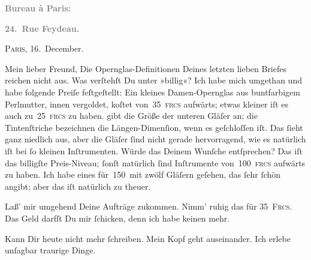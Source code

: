 \pstart
           \begin{otherlanguage}{french}\textcolor{gray}{\textbf{\textbf{Bureau à Paris:}}}\end{otherlanguage}\pend
           
\pstart
           \begin{otherlanguage}{french}\textcolor{gray}{\textbf{\textbf{24. Rue Feydeau.}}}\end{otherlanguage}\hfill \textsc{Paris}, 16. December.\pend
           
\pstart\center{}Mein lieber Freund,\pend\vspace{0.5em}
\pstart
           Die Opernglas-Definitionen Deines letzten lieben Briefes reichen nicht aus. Was
               verſtehſt Du unter »billig«? Ich habe mich umgethan\strikeout{,}
               und habe folgende Preiſe feſtgeſtellt: Ein kleines Damen-Opernglas aus buntfarbigem
               Perlmutter, innen vergoldet, koſtet von 35 \textsc{frcs} aufwärts;
               etwas kleiner iſt es auch zu 25 \textsc{frcs} zu haben. \label{K_L02759-1v}\label{K_L02759-1} gibt die
               Größe der unteren Gläſer an; die {\pb}Tintenſtriche
               bezeichnen die Längen-Dimenſion, wenn es geſchloſſen iſt. Das ſieht ganz niedlich
               aus, aber die Gläſer ſind nicht gerade hervorragend, wie es natürlich iſt bei ſo
               kleinen Inſtrumenten. Würde das Deinem Wunſche entſprechen? Das iſt das billigſte
               Preis-Niveau; ſonſt natürlich ſind Inſtrumente von 100 \textsc{frcs}
               aufwärts zu haben. Ich habe eines für 150 mit zwölf Gläſern geſehen, das ſehr ſchön
               angibt; aber das iſt {\pb}natürlich zu theuer.\pend
           
\pstart
           Laß’ mir umgehend Deine Aufträge zukommen. Nimm’ ruhig das für \textsc{35 Frcs}. Das Geld darfſt Du mir ſchicken, denn ich habe keinen \label{K_L02759-2v}\label{K_L02759-2} mehr.\pend
           
\pstart
           Kann Dir heute nicht mehr ſchreiben. Mein Kopf geht auseinander. Ich erlebe unſagbar
               traurige Dinge.\pend
           
